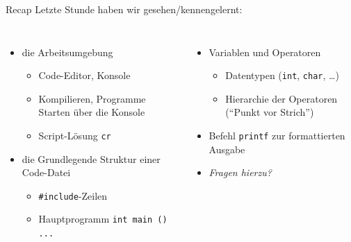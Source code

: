 
\begin{frame}[t,plain]
\titlepage
\end{frame}


\begin{frame}[fragile]{Recap}
%
Letzte Stunde haben wir gesehen/kennengelernt:
%
\begin{columns}[T]
\begin{itemize}
\item die Arbeitsumgebung
	\begin{itemize}
	\item Code-Editor, Konsole
	\item Kompilieren, Programme Starten über die Konsole
	\item Script-Lösung \texttt{cr}
	\end{itemize}
\item die Grundlegende Struktur einer Code-Datei
	\begin{itemize}
	\item \texttt{#include}-Zeilen
	\item Hauptprogramm \texttt{int main () { ... }}
	\end{itemize}
\end{itemize}
%
\begin{itemize}
\item Variablen und Operatoren
	\begin{itemize}
	\item Datentypen (\zB \texttt{int}, \texttt{char}, \ldots)
	\item Hierarchie der Operatoren (\enquote{Punkt vor Strich})
	\end{itemize}
\item Befehl \texttt{printf} zur formattierten Ausgabe
\item \emph{Fragen hierzu?}
\end{itemize}
\end{columns}
%
\end{frame}


